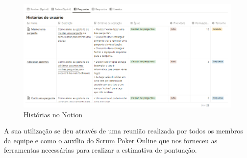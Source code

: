 \begin{figure}[htb]
\centering
\caption{Histórias no Notion}
\label{metricas_historias}
\includegraphics[width=1.0\textwidth]{anexos/Imagens_Desenvolvimento/metricas_historias.png}
\end{figure}
\FloatBarrier

A sua utilização se deu através de uma reunião realizada por todos os membros da equipe e como o auxílio do \href{https://www.scrumpoker-online.org/en/}{Scrum Poker Online} que nos forneceu as ferramentas necessárias para realizar a estimativa de pontuação.

